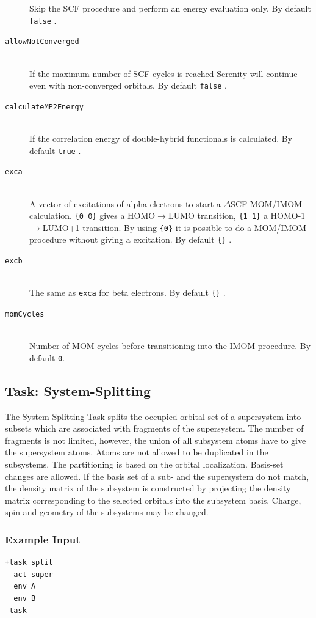\documentclass[bibliography=totocnumbered,a4paper,10pt,oneside]{scrbook}
\newcommand{\ttt}[1]{%
  \begingroup\setlength{\fboxsep}{1pt}%
  \colorbox{serenity-green!30}{\texttt{\hspace*{2pt}\vphantom{(g}#1\hspace*{2pt}}}%
  \endgroup
}
\begin{document}
\begin{description}
	Skip the SCF procedure and perform an energy evaluation only. By default \ttt{false}.
	\item[\texttt{allowNotConverged}]\hfill \\
  If the maximum number of SCF cycles is reached Serenity will continue even with non-converged orbitals. By default \ttt{false}.
  \item[\texttt{calculateMP2Energy}]\hfill \\
  If the correlation energy of double-hybrid functionals is calculated. By default \ttt{true}.
  \item[\texttt{exca}]\hfill \\
  A vector of excitations of alpha-electrons to start a $\Delta$SCF MOM/IMOM~\cite{Gilbert2008,Barca2018} calculation. \ttt{\{0 0\}} gives a HOMO$\rightarrow$LUMO transition, \ttt{\{1 1\}} a HOMO-1$\rightarrow$LUMO+1 transition. By using \ttt{\{0\}} it is possible to do a MOM/IMOM procedure without giving a excitation. By default \ttt{\{\}}.
  \item[\texttt{excb}]\hfill \\
  The same as \texttt{exca} for beta electrons. By default \ttt{\{\}}.
  \item[\texttt{momCycles}]\hfill \\
  Number of MOM cycles before transitioning into the IMOM procedure. By default \texttt{0}.
\end{description}

\subsection{Task: System-Splitting}
The System-Splitting Task splits the occupied orbital set of a supersystem into subsets which are associated with fragments of the supersystem. The number of fragments is not limited, however, the union of all subsystem atoms have to give the supersystem atoms. Atoms are not allowed to be duplicated in the subsystems. The partitioning is based on the orbital localization. Basis-set changes are allowed. If the basis set of a sub- and the supersystem do not match, the density matrix of the subsystem is constructed by projecting the density matrix corresponding to the selected orbitals into the subsystem basis. Charge, spin and geometry of
the subsystems may be changed.
\subsubsection{Example Input}
\begin{lstlisting}
+task split
  act super
  env A
  env B
-task
\end{lstlisting}
\end{document}
